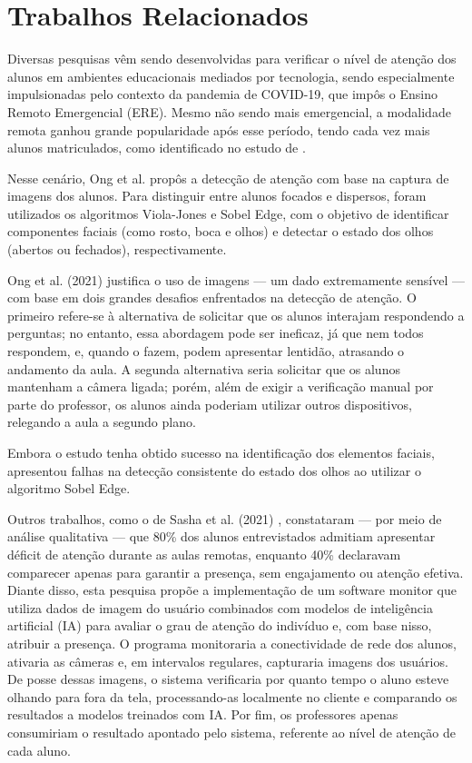 \section{Trabalhos Relacionados}\label{sec:related}
Diversas pesquisas vêm sendo desenvolvidas para verificar o nível de atenção dos alunos em ambientes educacionais mediados por tecnologia, sendo especialmente impulsionadas pelo contexto da pandemia de COVID-19, que impôs o Ensino Remoto Emergencial (ERE). Mesmo não sendo mais emergencial, a modalidade remota ganhou grande popularidade após esse período, tendo cada vez mais alunos matriculados, como identificado no estudo de \cite{moran2009ensino}. 

Nesse cenário, Ong et al. \cite{ong2021application} propôs a detecção de atenção com base na captura de imagens dos alunos. Para distinguir entre alunos focados e dispersos, foram utilizados os algoritmos Viola-Jones e Sobel Edge, com o objetivo de identificar componentes faciais (como rosto, boca e olhos) e detectar o estado dos olhos (abertos ou fechados), respectivamente.

Ong et al. (2021) \cite{ong2021application} justifica o uso de imagens — um dado extremamente sensível — com base em dois grandes desafios enfrentados na detecção de atenção. O primeiro refere-se à alternativa de solicitar que os alunos interajam respondendo a perguntas; no entanto, essa abordagem pode ser ineficaz, já que nem todos respondem, e, quando o fazem, podem apresentar lentidão, atrasando o andamento da aula. A segunda alternativa seria solicitar que os alunos mantenham a câmera ligada; porém, além de exigir a verificação manual por parte do professor, os alunos ainda poderiam utilizar outros dispositivos, relegando a aula a segundo plano.

Embora o estudo tenha obtido sucesso na identificação dos elementos faciais, apresentou falhas na detecção consistente do estado dos olhos ao utilizar o algoritmo Sobel Edge.

Outros trabalhos, como o de Sasha et al. (2021) \cite{saha2021attendance}, constataram — por meio de análise qualitativa — que 80\% dos alunos entrevistados admitiam apresentar déficit de atenção durante as aulas remotas, enquanto 40\% declaravam comparecer apenas para garantir a presença, sem engajamento ou atenção efetiva. Diante disso, esta pesquisa propõe a implementação de um software monitor que utiliza dados de imagem do usuário combinados com modelos de inteligência artificial (IA) para avaliar o grau de atenção do indivíduo e, com base nisso, atribuir a presença. O programa monitoraria a conectividade de rede dos alunos, ativaria as câmeras e, em intervalos regulares, capturaria imagens dos usuários. De posse dessas imagens, o sistema verificaria por quanto tempo o aluno esteve olhando para fora da tela, processando-as localmente no cliente e comparando os resultados a modelos treinados com IA. Por fim, os professores apenas consumiriam o resultado apontado pelo sistema, referente ao nível de atenção de cada aluno.

